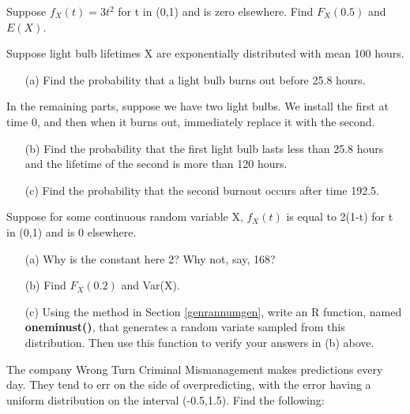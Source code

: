 \oneproblem
Suppose $f_X(t) = 3t^2$ for t in (0,1) and is zero elsewhere.  Find 
$F_X(0.5)$ and $E(X)$.

\oneproblem
Suppose light bulb lifetimes X are exponentially distributed
with mean 100 hours.  

\begin{itemize}

\item [(a)] Find the probability that a light bulb burns out before
25.8 hours.

\end{itemize}

In the remaining parts, suppose we have two light bulbs.  We install the
first at time 0, and then when it burns out, immediately replace it with
the second.

\begin{itemize}

\item [(b)] Find the probability that the first light bulb lasts less
than 25.8 hours and the lifetime of the second is more than 120 hours.

\item [(c)] Find the probability that the second burnout occurs after
time 192.5.

\end{itemize}

\oneproblem
Suppose for some continuous random variable X, $f_X(t)$ is equal to 2(1-t)
for t in (0,1) and is 0 elsewhere.

\begin{itemize}

\item [(a)] Why is the constant here 2? Why not, say, 168? 

\item [(b)] Find $F_X(0.2)$ and Var(X). 

\item [(c)] Using the method in Section \ref{genrannumgen}, write an 
R function, named {\bf oneminust()}, that generates a random variate
sampled from this distribution. Then use this function to verify your 
answers in (b) above. 

\end{itemize}

\oneproblem
The company Wrong Turn Criminal Mismanagement makes predictions every
day. They tend to err on the side of overpredicting, with the error
having a uniform distribution on the interval (-0.5,1.5). Find the
following: 

